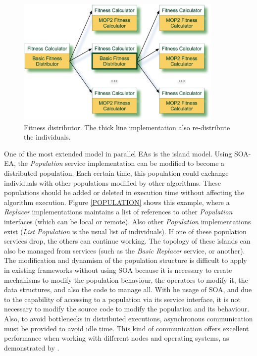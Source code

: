 \begin{figure}
\centering
\includegraphics[width=10cm]{gfx/soaea/distributor.jpg}
\caption{Fitness distributor. The thick line implementation also re-distribute the individuals.}
\label{FITNESSDISTRIBUTOR}
\end{figure}



One of the most extended model in parallel EAs is the island model. Using SOA-EA, the {\em Population} service implementation can be modified to become a distributed population. Each certain time, this population could exchange individuals with other populations modified by other algorithms. These populations should be added or deleted in execution time without affecting the algorithm execution. Figure \ref{POPULATION} shows this example, where a {\em Replacer} implementations maintains a list of references to other {\em Population} interfaces (which can be local or remote). Also other {\em Population} implementations exist ({\em List Population} is the usual list of individuals). If one of these population services drop, the others can continue working. The topology of these islands can also be managed from services (such as the {\em Basic Replacer} service, or another). The  modification and dynamism of the population structure is difficult to apply in existing frameworks without using SOA because it is necessary to create mechanisms to modify the population behaviour, the operators to modify it, the data structures, and also the code to manage all. With he usage of SOA, and due to the capability of accessing to a population via its service interface, it is not necessary to modify the source code to modify the population and its behaviour. Also, to avoid bottlenecks in distributed executions, asynchronous communication must be provided to avoid idle time. This kind of communication offers excellent performance when working with different nodes and operating systems, as demonstrated by \cite{Alba2002Heterogeneous}.



